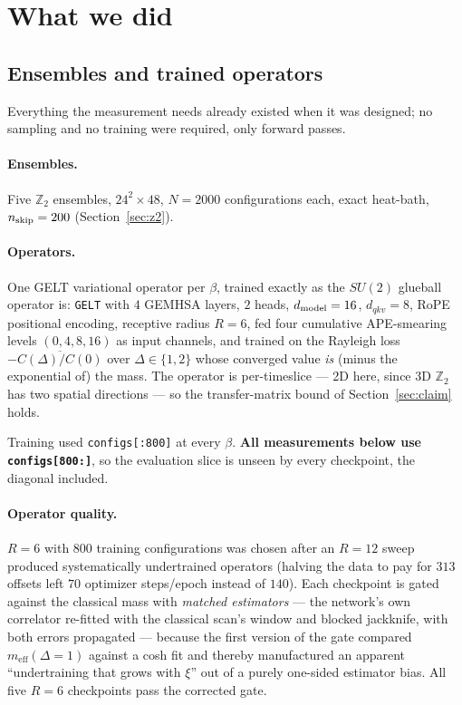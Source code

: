 \documentclass[11pt,a4paper]{article}
\newcommand{\meff}{m_{\mathrm{eff}}}
\begin{document}
\section{What we did}
\label{sec:method}

\subsection{Ensembles and trained operators}

Everything the measurement needs already existed when it was designed; no
sampling and no training were required, only forward passes.

\paragraph{Ensembles.} Five $\mathbb{Z}_2$ ensembles, $24^2\times48$, $N=2000$
configurations each, exact heat-bath, $n_{\rm skip} = 200$
(Section~\ref{sec:z2}).

\paragraph{Operators.} One GELT variational operator per $\beta$, trained
exactly as the $SU(2)$ glueball operator is: \texttt{GELT} with $4$ GEMHSA
layers, $2$ heads, $d_{\rm model}=16$, $d_{qkv}=8$, RoPE positional encoding,
receptive radius $R=6$, fed four cumulative APE-smearing levels
$(0,4,8,16)$ as input channels, and trained on the Rayleigh loss
$-\overline{C(\Delta)/C(0)}$ over $\Delta\in\{1,2\}$ whose converged value
\emph{is} (minus the exponential of) the mass. The operator is
per-timeslice --- 2D here, since 3D $\mathbb{Z}_2$ has two spatial directions
--- so the transfer-matrix bound of Section~\ref{sec:claim} holds.

Training used \texttt{configs[:800]} at every $\beta$. \textbf{All measurements
below use \texttt{configs[800:]}}, so the evaluation slice is unseen by every
checkpoint, the diagonal included.

\paragraph{Operator quality.} $R=6$ with $800$ training configurations was
chosen after an $R=12$ sweep produced systematically undertrained operators
(halving the data to pay for $313$ offsets left $70$ optimizer steps/epoch
instead of $140$). Each checkpoint is gated against the classical mass with
\emph{matched estimators} --- the network's own correlator re-fitted with the
classical scan's window and blocked jackknife, with both errors propagated ---
because the first version of the gate compared $\meff(\Delta{=}1)$ against a
cosh fit and thereby manufactured an apparent ``undertraining that grows with
$\xi$'' out of a purely one-sided estimator bias. All five $R=6$ checkpoints
pass the corrected gate.
\end{document}
